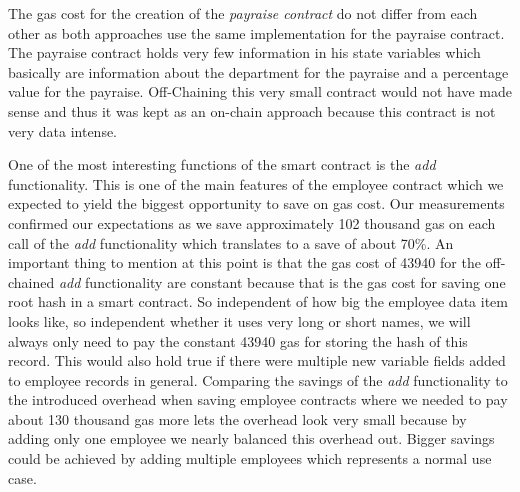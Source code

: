 The gas cost for the creation of the \textit{payraise contract} do not differ from each other as both approaches use the same implementation for the payraise contract.
The payraise contract holds very few information in his state variables which basically are information about the department for the payraise and a percentage value for the payraise.
Off-Chaining this very small contract would not have made sense and thus it was kept as an on-chain approach because this contract is not very data intense.

One of the most interesting functions of the smart contract is the \textit{add} functionality.
This is one of the main features of the employee contract which we expected to yield the biggest opportunity to save on gas cost.
Our measurements confirmed our expectations as we save approximately 102 thousand gas on each call of the \textit{add} functionality which translates to a save of about 70\%.
An important thing to mention at this point is that the gas cost of 43940 for the off-chained \textit{add} functionality are constant because that is the gas cost for saving one root hash in a smart contract.
So independent of how big the employee data item looks like, so independent whether it uses very long or short names, we will always only need to pay the constant 43940 gas for storing the hash of this record.
This would also hold true if there were multiple new variable fields added to employee records in general.
Comparing the savings of the \textit{add} functionality to the introduced overhead when saving employee contracts where we needed to pay about 130 thousand gas more lets the overhead look very small because by adding only one employee we nearly balanced this overhead out.
Bigger savings could be achieved by adding multiple employees which represents a normal use case.

